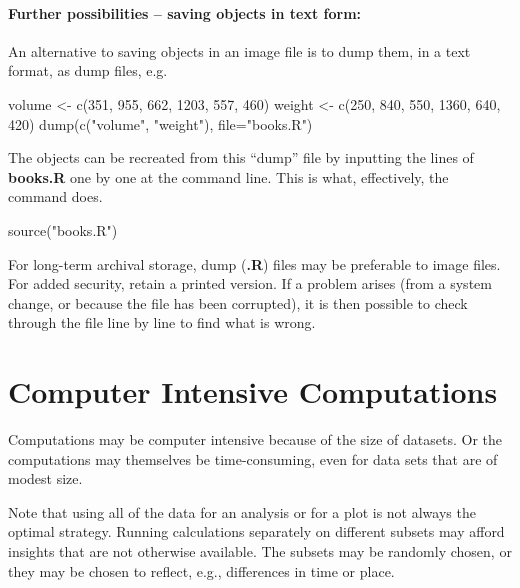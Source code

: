 \paragraph{Further possibilities -- saving objects in text form:}
An alternative to saving objects in an
image file is to dump them, in a text format, as dump files, e.g.
\begin{Schunk}
\begin{Sinput}
volume <- c(351, 955, 662, 1203, 557, 460)
weight <- c(250, 840, 550, 1360, 640, 420)
dump(c("volume", "weight"), file="books.R")
\end{Sinput}
\end{Schunk}
The objects can be recreated
 from this ``dump'' file by inputting the
lines of \textbf{books.R} one by one at the command line. This is what,
effectively, the command  does.
\begin{Schunk}
\begin{Sinput}
source("books.R")
\end{Sinput}
\end{Schunk}

For long-term archival storage, dump (\textbf{.R}) files may be
preferable to image files.  For added security, retain a printed
version.  If a problem arises (from a system change, or because the
file has been corrupted), it is then possible to check through the
file line by line to find what is wrong.

\section{Computer Intensive Computations}\label{sec:large-dset}
Computations may be computer intensive because of the size of
datasets.  Or the computations may themselves be time-consuming, 
even for data sets that are of modest size.

Note that using all of the data for an analysis or for a plot is not
always the optimal strategy.  Running calculations separately on
different subsets may afford insights that are not otherwise
available. The subsets may be randomly chosen, or they may be chosen
to reflect, e.g., differences in time or place.


